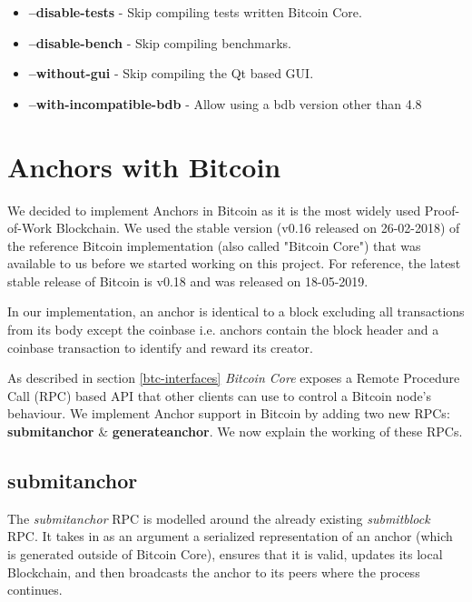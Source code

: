 \begin{itemize}
    \item \textbf{--disable-tests} - Skip compiling tests written Bitcoin Core.
    \item \textbf{--disable-bench} - Skip compiling benchmarks.
    \item \textbf{--without-gui} - Skip compiling the Qt based GUI.
    \item \textbf{--with-incompatible-bdb} - Allow using a bdb version other than 4.8
\end{itemize}


\section{Anchors with Bitcoin} \label{impl-anchors}

We decided to implement Anchors in Bitcoin as it is the most widely used Proof-of-Work Blockchain. We used the stable version (v0.16 released on 26-02-2018) of the reference Bitcoin implementation (also called "Bitcoin Core") that was available to us before we started working on this project. For reference, the latest stable release of Bitcoin is v0.18 and was released on 18-05-2019. 

In our implementation, an anchor is identical to a block excluding all transactions from its body except the coinbase i.e. anchors contain the block header and a coinbase transaction to identify and reward its creator. 

As described in section \ref{btc-interfaces} \textit{Bitcoin Core} exposes a Remote Procedure Call (RPC) based API that other clients can use to control a Bitcoin node's behaviour. We implement Anchor support in Bitcoin by adding two new RPCs: \textbf{submitanchor} \& \textbf{generateanchor}. We now explain the working of these RPCs.


\subsection{submitanchor} \label{impl-submitanchor}

The \textit{submitanchor} RPC is modelled around the already existing \textit{submitblock} RPC. 
It takes in as an argument a serialized representation of an anchor (which is generated outside of Bitcoin Core), ensures that it is valid, updates its local Blockchain, and then broadcasts the anchor to its peers where the process continues.

